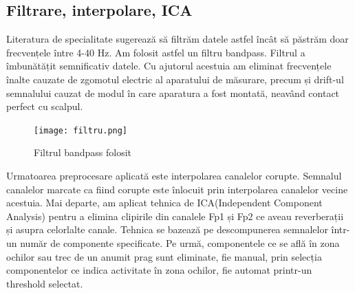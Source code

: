 

\subsection{Filtrare, interpolare, ICA}

Literatura de specialitate sugerează să filtrăm datele astfel încât să păstrăm doar frecvențele între 4-40 Hz. Am folosit astfel un filtru bandpass. Filtrul a îmbunătățit semnificativ datele. Cu ajutorul acestuia am eliminat frecvențele înalte cauzate de zgomotul electric al aparatului de măsurare, precum și drift-ul semnalului cauzat de modul în care aparatura a fost montată, neavând contact perfect cu scalpul.  %

\setlength{\abovecaptionskip}{0pt}
\setlength{\belowcaptionskip}{0pt}
\clearpage
\begin{figure}[h]
    \centering
    \texttt{[image: filtru.png]}
    \caption{Filtrul bandpass folosit}
    \label{fig:vizualizare_filtru}
\end{figure}

Urmatoarea preprocesare aplicată este interpolarea canalelor corupte. Semnalul canalelor marcate ca fiind corupte este înlocuit prin interpolarea canalelor vecine acestuia. Mai departe, am aplicat tehnica de ICA(Independent Component Analysis) pentru a elimina clipirile din canalele Fp1 și Fp2 ce aveau reverberații și asupra celorlalte canale. Tehnica se bazează pe descompunerea semnalelor într-un număr de componente specificate. Pe urmă, componentele ce se află în zona ochilor sau trec de un anumit prag sunt eliminate, fie manual, prin selecția componentelor ce indica activitate în zona ochilor, fie automat printr-un threshold selectat.

